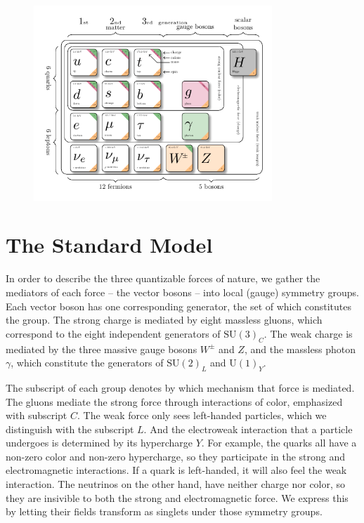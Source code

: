 % 
\begin{figure}[!h]
    \centering
    \includegraphics[width=0.8\textwidth]{figures/SM_figure.pdf}
\end{figure}
\section{The Standard Model}\label{ch:SM}
In order to describe the three quantizable forces of nature, we gather the mediators of each force -- the vector bosons -- into local (gauge) symmetry groups. 
Each vector boson has one corresponding generator, the set of which constitutes the group.
The strong charge is mediated by eight massless gluons, which correspond to the eight independent generators of $\text{SU}(3)_C$. 
The weak charge is mediated by the three massive gauge bosons $W^\pm$ and $Z$, and the massless photon $\gamma$, 
which constitute the generators of $\text{SU}(2)_L$ and $\text{U}(1)_Y$. 

The subscript of each group denotes by which mechanism that force is mediated. The gluons mediate the strong force through interactions of color,
emphasized with subscript $C$. The weak force only sees left-handed particles, 
which we distinguish with the subscript $L$. And the electroweak interaction that a particle undergoes is determined by its hypercharge $Y$. 
For example, the quarks all have a non-zero color and non-zero hypercharge, 
so they participate in the strong and electromagnetic interactions. If a quark is left-handed, it will also feel the weak interaction. 
The neutrinos on the other hand, have neither charge nor color, 
so they are insivible to both the strong and electromagnetic force. We express this by letting their fields transform as singlets under those symmetry groups.

